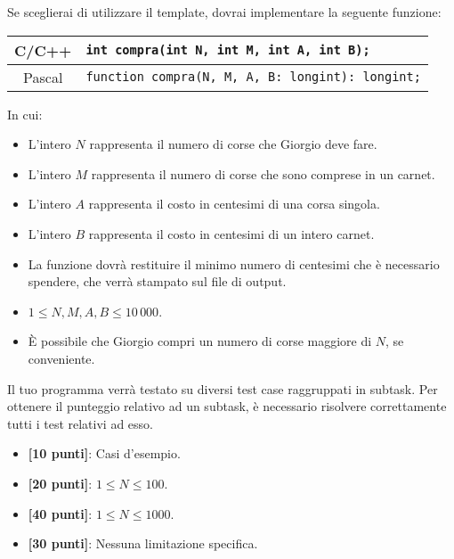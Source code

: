 Se sceglierai di utilizzare il template, dovrai implementare la seguente funzione:
\begin{center}\begin{tabularx}{\textwidth}{|c|X|}
\hline
C/C++  & \verb|int compra(int N, int M, int A, int B);|\\
\hline
Pascal & \verb|function compra(N, M, A, B: longint): longint;|\\
\hline
\end{tabularx}\end{center}
In cui:
\begin{itemize}[nolistsep]
  \item L'intero $N$ rappresenta il numero di corse che Giorgio deve fare.
  \item L'intero $M$ rappresenta il numero di corse che sono comprese in un carnet.
  \item L'intero $A$ rappresenta il costo in centesimi di una corsa singola.
  \item L'intero $B$ rappresenta il costo in centesimi di un intero carnet.
  \item La funzione dovrà restituire il minimo numero di centesimi che è necessario spendere, che verrà stampato sul file di output.
\end{itemize}

\Constraints 
\begin{itemize}[nolistsep,itemsep=2mm]
  \item $1 \le N, M, A, B \le 10\,000$.
  \item È possibile che Giorgio compri un numero di corse maggiore di $N$, se conveniente.
\end{itemize}

\newpage
\Scoring
Il tuo programma verrà testato su diversi test case raggruppati in subtask.
Per ottenere il punteggio relativo ad un subtask, è necessario risolvere
correttamente tutti i test relativi ad esso.

\begin{itemize}[nolistsep,itemsep=2mm]
  \item \textbf{ [10 punti]}: Casi d'esempio.
  \item \textbf{ [20 punti]}: $1 \le N \le 100$.
  \item \textbf{ [40 punti]}: $1 \le N \le 1000$.
  \item \textbf{ [30 punti]}: Nessuna limitazione specifica.
\end{itemize}

